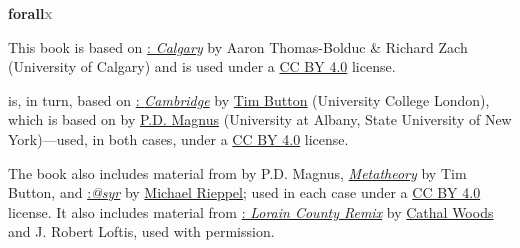 

\graphicspath{{assets/}}

\pagestyle{empty}

\vspace*{65mm}

\begin{raggedleft}
\sffamily
{\Huge\textbf{{forall\hspace{.08em}\textcolor{gray}{x}}}}

\bigskip
{\large{\textcolor{maroon}{\uppercase{}}}}  

\bigskip







\vfill
{\small{\textls{\forallxversion}}}\par 	%

\end{raggedleft}

\newpage 

\vspace*{\fill}

\noindent \small This book is based on \href{http://forallx.openlogicproject.org/}{\forallx:\emph{ Calgary}} by {Aaron Thomas-Bolduc \& Richard Zach} ({University of Calgary}) and is used under a \href{https://creativecommons.org/licenses/by/4.0/}{CC BY 4.0} license.
\medskip

 is, in turn, based on \href{http://www.homepages.ucl.ac.uk/~uctytbu/OERs.html}{\forallx:\emph{ Cambridge}} by \href{http://www.homepages.ucl.ac.uk/~uctytbu/}{Tim Button} ({University College London}), 
which is based on \href{https://www.fecundity.com/logic/}{\forallx} by \href{https://www.fecundity.com/job/}{P.D. Magnus} (University at Albany, State University of New York)---used, in both cases, under a \href{https://creativecommons.org/licenses/by/4.0/}{CC BY 4.0} license.
\medskip

\noindent The book also includes material from \forallx{} by P.D. Magnus, \href{http://www.homepages.ucl.ac.uk/~uctytbu/OERs.html}{\emph{Metatheory}} by Tim Button, and 
\href{https://mrieppel.net/teaching/index.html#forallx}{\forallx:\emph{@syr}} by \href{https://mrieppel.net/index.html}{Michael Rieppel}; used in each case under a \href{https://creativecommons.org/licenses/by/4.0/}{CC BY 4.0} license. It also includes material from  
\href{https://github.com/rob-helpy-chalk/openintroduction}{\forallx: \emph{Lorain County Remix}} by \href{https://sites.google.com/site/cathalwoods/}{Cathal Woods} and J. Robert Loftis, used with permission.
\bigskip

